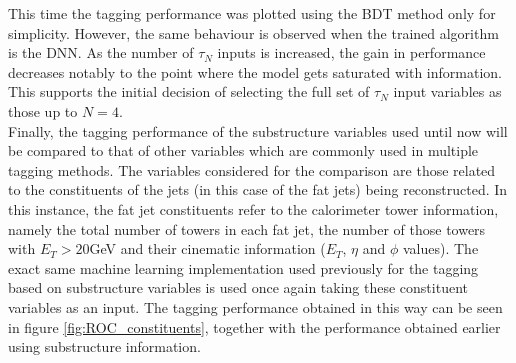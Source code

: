 \documentclass[main]{subfiles} %
\begin{document}
This time the tagging performance was plotted using the BDT method only for simplicity. However, the same behaviour is observed when the trained algorithm is the DNN. As the number of $\tau_N$ inputs is increased, the gain in performance decreases notably to the point where the model gets saturated with information. This supports the initial decision of selecting the full set of $\tau_N$ input variables as those up to $N = 4$. \\

Finally, the tagging performance of the substructure variables used until now will be compared to that of other variables which are commonly used in multiple tagging methods. The variables considered for the comparison are those related to the constituents of the jets (in this case of the fat jets) being reconstructed. In this instance, the fat jet constituents refer to the calorimeter tower information, namely the total number of towers in each fat jet, the number of those towers with $E_T > 20$\;GeV and their cinematic information ($E_T$, $\eta$ and $\phi$ values). The exact same machine learning implementation used previously for the tagging based on substructure variables is used once again taking these constituent variables as an input. The tagging performance obtained in this way can be seen in figure \ref{fig:ROC_constituents}, together with the performance obtained earlier using substructure information.\\  
\end{document}
